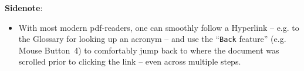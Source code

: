\npi%
\textbf{Sidenote}:
\begin{itemize}
    \item
With most modern pdf-readers, one can smoothly follow a Hyperlink -- e.g. to the Glossary for looking up an acronym -- and use the \enquote{\texttt{Back} feature} (e.g. Mouse Button~4) to comfortably jump back to where the document was scrolled prior to clicking the link -- even across multiple steps.
\end{itemize}